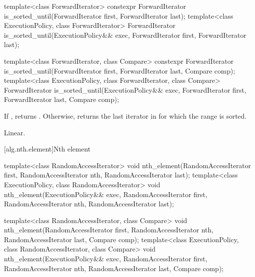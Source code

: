 %
\begin{itemdecl}
template<class ForwardIterator>
  constexpr ForwardIterator
    is_sorted_until(ForwardIterator first, ForwardIterator last);
template<class ExecutionPolicy, class ForwardIterator>
  ForwardIterator
    is_sorted_until(ExecutionPolicy&& exec,
                    ForwardIterator first, ForwardIterator last);

template<class ForwardIterator, class Compare>
  constexpr ForwardIterator
    is_sorted_until(ForwardIterator first, ForwardIterator last,
                    Compare comp);
template<class ExecutionPolicy, class ForwardIterator, class Compare>
  ForwardIterator
    is_sorted_until(ExecutionPolicy&& exec,
                    ForwardIterator first, ForwardIterator last,
                    Compare comp);
\end{itemdecl}


\begin{itemdescr}
\pnum
\returns If , returns
. Otherwise, returns
the last iterator  in  for which the
range  is sorted.

\pnum
\complexity Linear.
\end{itemdescr}

[alg.nth.element]{Nth element}

%
\begin{itemdecl}
template<class RandomAccessIterator>
  void nth_element(RandomAccessIterator first, RandomAccessIterator nth,
                   RandomAccessIterator last);
template<class ExecutionPolicy, class RandomAccessIterator>
  void nth_element(ExecutionPolicy&& exec,
                   RandomAccessIterator first, RandomAccessIterator nth,
                   RandomAccessIterator last);

template<class RandomAccessIterator, class Compare>
  void nth_element(RandomAccessIterator first, RandomAccessIterator nth,
                   RandomAccessIterator last,  Compare comp);
template<class ExecutionPolicy, class RandomAccessIterator, class Compare>
  void nth_element(ExecutionPolicy&& exec,
                   RandomAccessIterator first, RandomAccessIterator nth,
                   RandomAccessIterator last, Compare comp);
\end{itemdecl}

